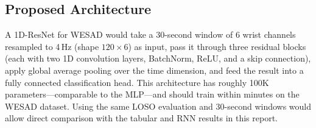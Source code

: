 \documentclass[11pt]{article}
\begin{document}
\subsection{Proposed Architecture}
A 1D-ResNet for WESAD would take a 30-second window of 6 wrist channels resampled to 4\,Hz (shape $120 \times 6$) as input, pass it through three residual blocks (each with two 1D convolution layers, BatchNorm, ReLU, and a skip connection), apply global average pooling over the time dimension, and feed the result into a fully connected classification head.
This architecture has roughly 100K parameters---comparable to the MLP---and should train within minutes on the WESAD dataset.
Using the same LOSO evaluation and 30-second windows would allow direct comparison with the tabular and RNN results in this report.
\end{document}
